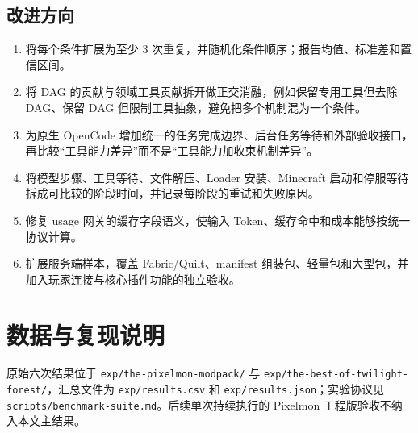\documentclass[UTF8,a4paper,11pt]{ctexart}
\begin{document}
\subsection{改进方向}
\begin{enumerate}
  \item 将每个条件扩展为至少 3 次重复，并随机化条件顺序；报告均值、标准差和置信区间。
  \item 将 DAG 的贡献与领域工具贡献拆开做正交消融，例如保留专用工具但去除 DAG、保留 DAG 但限制工具抽象，避免把多个机制混为一个条件。
  \item 为原生 OpenCode 增加统一的任务完成边界、后台任务等待和外部验收接口，再比较“工具能力差异”而不是“工具能力加收束机制差异”。
  \item 将模型步骤、工具等待、文件解压、Loader 安装、Minecraft 启动和停服等待拆成可比较的阶段时间，并记录每阶段的重试和失败原因。
  \item 修复 usage 网关的缓存字段语义，使输入 Token、缓存命中和成本能够按统一协议计算。
  \item 扩展服务端样本，覆盖 Fabric/Quilt、manifest 组装包、轻量包和大型包，并加入玩家连接与核心插件功能的独立验收。
\end{enumerate}

\enlargethispage{3\baselineskip}
\section*{数据与复现说明}
原始六次结果位于 \texttt{exp/the-pixelmon-modpack/} 与 \texttt{exp/the-best-of-twilight-forest/}，汇总文件为 \texttt{exp/results.csv} 和 \texttt{exp/results.json}；实验协议见 \texttt{scripts/benchmark-suite.md}。后续单次持续执行的 Pixelmon 工程版验收不纳入本文主结果。
\end{document}
